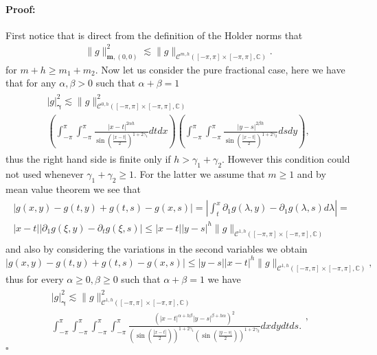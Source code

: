 \documentclass{article}
\newenvironment{proof}{\paragraph{Proof:}}{\hfill$\square$}
\newcommand{\IC}{{\mathbb C}}
\newcommand{\cmspaceh}[4]{\mathcal{C}^{#1,#2} \left( #3, #4 \right)}
\begin{document}
\begin{proof}
First notice that is direct from the definition of the Holder norms that 
\begin{align*}
 \|g\|^2_{\mathbf{m},(0,0)} \lesssim \|g\|_{\cmspaceh{m}{h}{[-\pi,\pi]\times[-\pi,\pi]}{\IC}}. 
\end{align*}
for $m+h \geq m_1 + m_2$. Now let us consider the pure fractional case, here we have that for any $\alpha, \beta >0$ such that $\alpha + \beta = 1$
\begin{align*}
\begin{split}
|g|_{\mathbf{\gamma}}^2 \lesssim \|g\|_{\cmspaceh{0}{h}{[-\pi,\pi]\times [-\pi,\pi]}{\IC}}^2\\ \left( \int_{-\pi}^{\pi}\int_{-\pi}^{\pi} \frac{|x-t|^{2\alpha h}}{\sin\left(\frac{|x-t|}{2} \right)^{1+2\gamma_1}} dt dx\right)
\left( \int_{-\pi}^{\pi}\int_{-\pi}^{\pi} \frac{|y-s|^{2\beta h}}{\sin\left(\frac{|x-t|}{2} \right)^{1+2\gamma_2}} ds dy\right),
\end{split}
\end{align*}
thus the right hand side is finite only if $h > \gamma_1 + \gamma_2$. However this condition could not used whenever $\gamma_1 +\gamma_2 \geq 1$. For the latter we assume that $m \geq 1$ and by mean value theorem we see that 
\begin{align*}
\begin{split}
|g(x,y)-g(t,y)+g(t,s)-g(x,s)|
=  \left\vert \int_{t}^x \partial_1 g(\lambda,y) - \partial_1 g(\lambda,s)d \lambda \right\vert = \\ |x-t|
 \left\vert\partial_1 g(\xi,y)-\partial_t g(\xi,s)\right\vert \leq |x-t||y-s|^h \|g \|_{\cmspaceh{1}{h}{[-\pi,\pi]\times[-\pi,\pi]}{\IC}}
\end{split}
\end{align*}
and also by considering the variations in the second variables we obtain
$$
|g(x,y)-g(t,y)+g(t,s)-g(x,s)|\leq |y-s||x-t|^h \|g \|_{\cmspaceh{1}{h}{[-\pi,\pi]\times[-\pi,\pi]}{\IC}},
$$
thus for every $\alpha\geq 0, \beta \geq 0$ such that $\alpha + \beta = 1$ we have 
\begin{align*}
\begin{split}
|g|_{\mathbf{\gamma}}^2 \lesssim \|g \|^2_{\cmspaceh{1}{h}{[-\pi,\pi]\times[-\pi,\pi]}{\IC}} \\
\int_{-\pi}^{\pi}  \int_{-\pi}^{\pi} \int_{-\pi}^{\pi}\int_{-\pi}^{\pi} \frac{ (|x-t|^{\alpha + h \beta}  
|y-s|^{\beta + h \alpha}
)^2}
{\left(\sin\left(\frac{|x-t|}{2}\right)\right)^{1+2\gamma_1}\left(\sin\left(\frac{|y-s|}{2}\right)\right)^{1+2\gamma_2}}dx dy dt ds.
\end{split},

\end{align*}
\end{proof}
\end{document}
